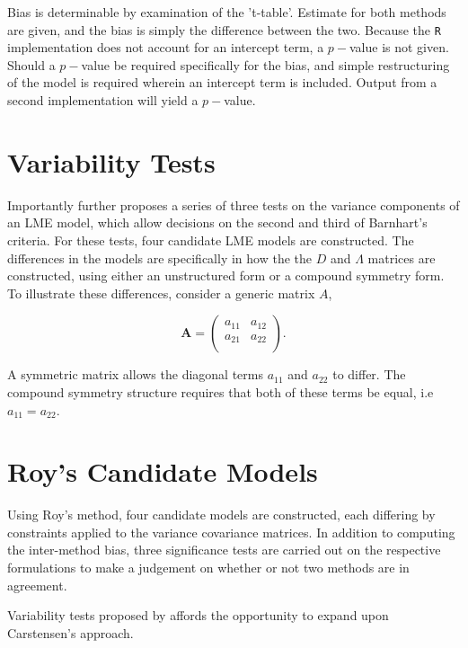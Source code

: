 \documentclass[12pt, a4paper]{report}
\theoremstyle{plain}
\theoremstyle{definition}
\theoremstyle{remark}
\begin{document}
Bias is determinable by examination of the 't-table'. Estimate for both methods are given, and the bias is simply the difference between the two. Because the \texttt{R} implementation does not account for an intercept term, a $p-$value is not given. Should a $p-$value be required specifically for the bias, and simple restructuring of the model is required wherein an intercept term is included. Output from a second implementation will yield a $p-$value.

\section{Variability Tests}

Importantly \citet{ARoy2009} further proposes a series of three tests on the variance components of an LME model, which allow decisions on the second and third of Barnhart's criteria. For these tests, four candidate LME models are constructed. The differences in the models are specifically in how the the $D$ and $\Lambda$ matrices are constructed, using either an unstructured form or a compound symmetry form. To illustrate these differences, consider a generic matrix $A$,

\[
\boldsymbol{A} = \left( \begin{array}{cc}
a_{11} & a_{12}  \\
a_{21} & a_{22}  \\
\end{array}\right).
\]



A symmetric matrix allows the diagonal terms $a_{11}$ and $a_{22}$ to differ. The compound symmetry structure requires that both of these terms be equal, i.e $a_{11} = a_{22}$.



\section{Roy's Candidate Models}

Using Roy's method, four candidate models are constructed, each differing by constraints applied to the variance covariance matrices. In addition to computing the inter-method bias, three significance tests are carried out on the respective formulations to make a judgement on whether or not two methods are in agreement.


Variability tests proposed by \citet{ARoy2009} affords the opportunity to expand upon Carstensen's approach.
\end{document}
